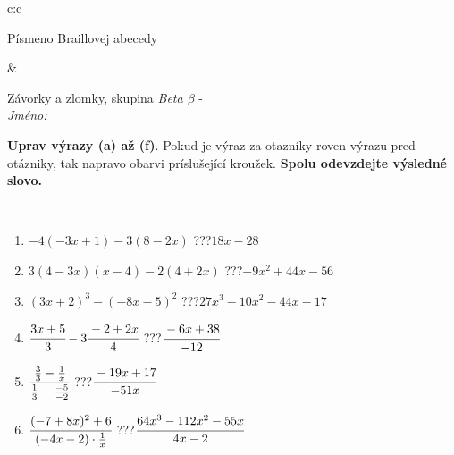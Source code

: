 \documentclass[10pt]{report}
\begin{document}
\begin{tabular}{c:c}
\begin{minipage}[c][104.5mm][t]{0.5\linewidth}
\begin{center}
\begin{minipage}{0.20\linewidth}
\begin{center}
{\small Písmeno Braillovej abecedy}
\end{center}
\end{minipage}
\end{center}
\end{minipage}
&
\begin{minipage}[c][104.5mm][t]{0.5\linewidth}
\begin{center}
\vspace{7mm}
{\huge Závorky a zlomky, skupina \textit{Beta $\beta$} -}\\[5mm]
\textit{Jméno:}\phantom{xxxxxxxxxxxxxxxxxxxxxxxxxxxxxxxxxxxxxxxxxxxxxxxxxxxxxxxxxxxxxxxxx}\\[5mm]
\begin{minipage}{0.95\linewidth}
\begin{center}
\textbf{Uprav výrazy (a) až (f)}. Pokud je výraz za otazníky roven výrazu pred otázniky, tak napravo obarvi príslušející kroužek. \textbf{Spolu odevzdejte výsledné slovo.}
\end{center}
\end{minipage}
\\[1mm]
\begin{minipage}{0.79\linewidth}
\begin{center}
\begin{varwidth}{\linewidth}
\begin{enumerate}
\normalsize
\item $-4(-3x+1)-3(8-2x)$\quad \dotfill\; ???\;\dotfill \quad $18x-28$
\item $3(4-3x)(x-4)-2(4+2x)$\quad \dotfill\; ???\;\dotfill \quad $-9x^2+44x-56$
\item $(3x+2)^3-(-8x-5)^2$\quad \dotfill\; ???\;\dotfill \quad $27x^3-10x^2-44x-17$
\item $\cfrac{3x+5}{3}-3\cfrac{-2+2x}{4}$\quad \dotfill\; ???\;\dotfill \quad $\cfrac{-6x+38}{-12}$
\item $\cfrac{\frac{3}{3}-\frac{1}{x}}{\frac{1}{3}+\frac{-5}{-2}}$\quad \dotfill\; ???\;\dotfill \quad $\cfrac{-19x+17}{-51x}$
\item $\cfrac{(-7+8x)^2+6}{(-4x-2)\cdot\frac{1}{x}}$\quad \dotfill\; ???\;\dotfill \quad $\cfrac{64x^3-112x^2-55x}{4x-2}$
\end{enumerate}
\end{varwidth}
\end{center}
\end{minipage}
\begin{minipage}{0.20\linewidth}
\begin{center}

\end{center}
\end{minipage}
\end{center}
\end{minipage}
\end{tabular}
\end{document}
